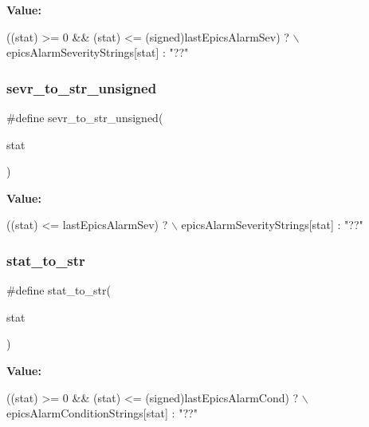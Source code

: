{\bfseries Value\+:}
\begin{DoxyCode}
((stat) >= 0 && (stat) <= (signed)lastEpicsAlarmSev) ?  \(\backslash\)
        epicsAlarmSeverityStrings[stat] : \textcolor{stringliteral}{"??"}
\end{DoxyCode}
\mbox{\label{cuepics-world_8h_a443b018d23b91b2a0cd3bb57ecda1053}} 
\subsubsection{sevr\+\_\+to\+\_\+str\+\_\+unsigned}
{\footnotesize\ttfamily \#define sevr\+\_\+to\+\_\+str\+\_\+unsigned(\begin{DoxyParamCaption}\item[{}]{stat }\end{DoxyParamCaption})}

{\bfseries Value\+:}
\begin{DoxyCode}
((stat) <= lastEpicsAlarmSev) ?         \(\backslash\)
        epicsAlarmSeverityStrings[stat] : \textcolor{stringliteral}{"??"}
\end{DoxyCode}
\mbox{\label{cuepics-world_8h_a834673cdde5183e266f5633f448ee6a4}} 
\subsubsection{stat\+\_\+to\+\_\+str}
{\footnotesize\ttfamily \#define stat\+\_\+to\+\_\+str(\begin{DoxyParamCaption}\item[{}]{stat }\end{DoxyParamCaption})}

{\bfseries Value\+:}
\begin{DoxyCode}
((stat) >= 0 && (stat) <= (signed)lastEpicsAlarmCond) ? \(\backslash\)
        epicsAlarmConditionStrings[stat] : \textcolor{stringliteral}{"??"}
\end{DoxyCode}
\mbox{\label{cuepics-world_8h_a11b6d756452c9d2f99639f8482463385}} 
